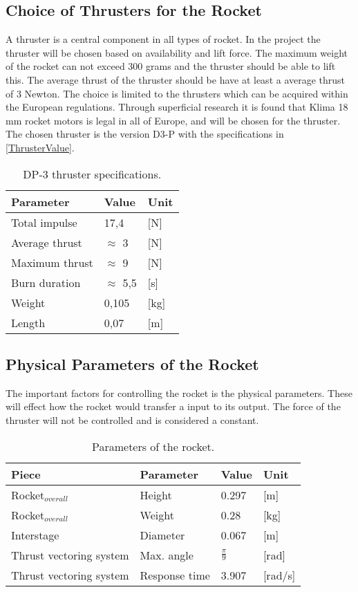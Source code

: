 \subsection{Choice of Thrusters for the Rocket}
A thruster is a central component in all types of rocket. In the project the thruster will be chosen based on availability and lift force. The maximum weight of the rocket can not exceed 300 grams and the thruster should be able to lift this. The average thrust of the thruster should be have at least a average thrust of 3 Newton. The choice is limited to the thrusters which can be acquired within the European regulations. Through superficial research it is found that Klima 18 mm rocket motors is legal in all of Europe, and will be chosen for the thruster. The chosen thruster is the version D3-P with the specifications in \autoref{ThrusterValue}.

\begin{table}[htbp]
\centering
\caption{DP-3 thruster specifications.}
\label{ThrusterValue}
\begin{tabular}{lll}
\hline
Parameter      & Value         & Unit \\ \hline
Total impulse  & 17,4          & [N]  \\
Average thrust & $\approx$ 3   & [N]  \\
Maximum thrust & $\approx$ 9 & [N]  \\
Burn duration  & $\approx$ 5,5 & [s]  \\
Weight         & 0,105         & [kg] \\
Length         & 0,07          & [m] 
\end{tabular}
\end{table}
                

\subsection{Physical Parameters of the Rocket}
The important factors for controlling the rocket is the physical parameters. These will effect how the rocket would transfer a input to its output. The force of the thruster will not be controlled and is considered a constant.  		
\begin{table}[htbp]
	\centering
\caption{Parameters of the rocket.}
\label{Rocket_measurements}
	\begin{tabular}{llll}
	\hline
	Piece & Parameter & Value & Unit \\ \hline
	Rocket$_{overall}$ & Height & 0.297 & {[}m{]} \\
	Rocket$_{overall}$ & Weight & 0.28 & {[}kg{]} \\
	Interstage & Diameter & 0.067 & {[}m{]} \\
	Thrust vectoring system & Max. angle & $\frac{\pi}{9}$ & {[}rad{]}\\
	Thrust vectoring system & Response time & 3.907 & {[}rad/s{]}
	\end{tabular}
\end{table}


